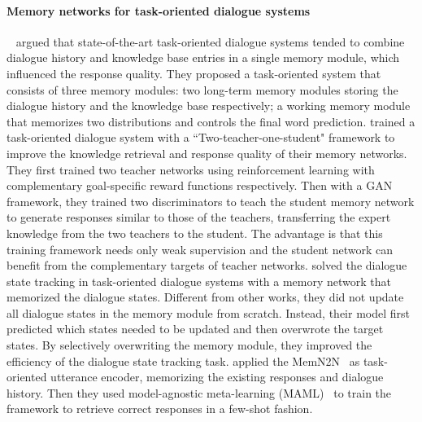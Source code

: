 \paragraph*{Memory networks for task-oriented dialogue systems}~ argued that state-of-the-art task-oriented dialogue systems tended to combine dialogue history and knowledge base entries in a single memory module, which influenced the response quality. They proposed a task-oriented system that consists of three memory modules: two long-term memory modules storing the dialogue history and the knowledge base respectively; a working memory module that memorizes two distributions and controls the final word prediction.  trained a task-oriented dialogue system with a ``Two-teacher-one-student" framework to improve the knowledge retrieval and response quality of their memory networks. They first trained two teacher networks using reinforcement learning with complementary goal-specific reward functions respectively. Then with a GAN framework, they trained two discriminators to teach the student memory network to generate responses similar to those of the teachers, transferring the expert knowledge from the two teachers to the student. The advantage is that this training framework needs only weak supervision and the student network can benefit from the complementary targets of teacher networks.  solved the dialogue state tracking in task-oriented dialogue systems with a memory network that memorized the dialogue states. Different from other works, they did not update all dialogue states in the memory module from scratch. Instead, their model first predicted which states needed to be updated and then overwrote the target states. By selectively overwriting the memory module, they improved the efficiency of the dialogue state tracking task.  applied the MemN2N~ as task-oriented utterance encoder, memorizing the existing responses and dialogue history. Then they used model-agnostic meta-learning (MAML)~ to train the framework to retrieve correct responses in a few-shot fashion. 
